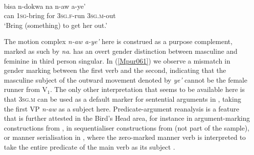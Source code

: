\ea \label{Mpur061}
\\
\gll bisa n-dokwa na n-aw a-ye' \\
can \textsc{1}\textsc{sg}-bring for \textsc{3}\textsc{sg}.\textsc{f}-run \textsc{3}\textsc{sg}.\textsc{m}-out \\
\glft `Bring (something) to get her out.'\\ 
\z

The motion complex \textit{n-aw a-ye'} here is construed as a purpose complement, marked as such by \textit{na}.  has an overt gender distinction between masculine and feminine in third person singular. In (\ref{Mpur061}) we observe a mismatch in gender marking between the first verb and the second, indicating that the masculine subject of the outward movement denoted by \textit{ye'} cannot be the female runner from V$_{1}$. The only other interpretation that seems to be available here is that \textsc{3sg.m} can be used as a default marker for sentential arguments in , taking the first VP \textit{n-aw} as a subject here. Predicate-argument reanalysis is a feature that is further attested in the Bird's Head area, for instance in argument-marking constructions from , in sequentialiser constructions from  (not part of the sample), or manner serialisation in , where the zero-marked manner verb is interpreted to take the entire predicate of the main verb as its subject \citep[299f.]{gravelle2010grammar}. 

